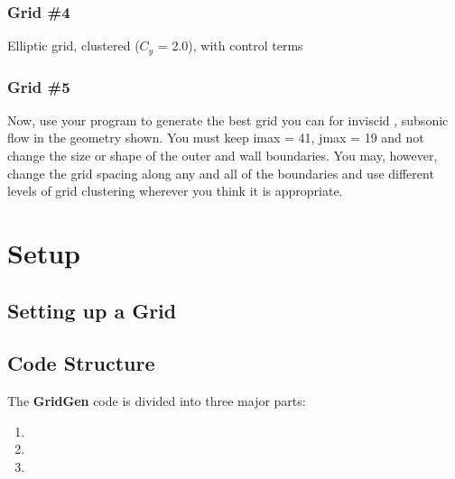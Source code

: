 \documentclass[letterpaper,10pt,english]{sphinxmanual}
\begin{document}
\subsubsection{Grid \#4}
\label{\detokenize{background:grid-4}}
Elliptic grid, clustered (\(C_{y}\) = 2.0), with control terms


\subsubsection{Grid \#5}
\label{\detokenize{background:grid-5}}
Now, use your program to generate the best grid you can for inviscid , subsonic flow in the geometry shown. You must keep imax = 41, jmax = 19 and not change the size or shape of the outer and wall boundaries. You may, however, change the grid spacing along any and all of the boundaries and use different levels of grid clustering wherever you think it is appropriate.


\section{Setup}
\label{\detokenize{setup:setup}}\label{\detokenize{setup:setup-gridgen}}\label{\detokenize{setup::doc}}

\subsection{Setting up a Grid}
\label{\detokenize{setup:setting-up-a-grid}}\label{\detokenize{setup:id1}}

\subsection{Code Structure}
\label{\detokenize{setup:code-structure}}\label{\detokenize{setup:structure}}
The {\color{red}\bfseries{}\textbar{}GridGen\textbar{}} code is divided into three major parts:
\begin{enumerate}
\item {} 

\item {} 

\item {} 

\end{enumerate}
\end{document}

